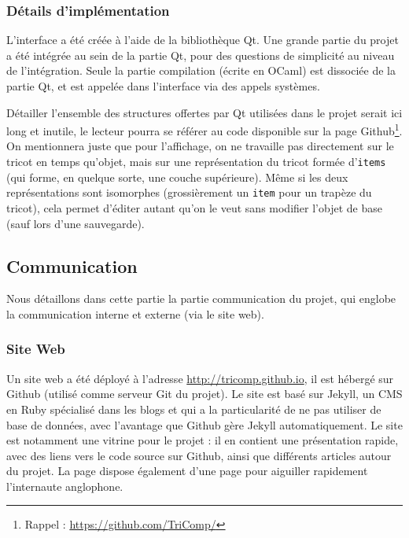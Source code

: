 \documentclass{article}
\begin{document}

\pagebreak

\subsubsection{Détails d'implémentation}

L'interface a été créée à l'aide de la bibliothèque Qt. Une grande
partie du projet a été intégrée au sein de la partie Qt, pour des
questions de simplicité au niveau de l'intégration. Seule la partie
compilation (écrite en OCaml) est dissociée de la partie Qt, et est
appelée dans l'interface via des appels systèmes.

Détailler l'ensemble des structures offertes par Qt utilisées dans le projet
serait ici long et inutile, le lecteur pourra se référer au code
disponible sur la page Github\footnote{Rappel :
  \url{https://github.com/TriComp/}}. On mentionnera juste que pour
l'affichage, on ne travaille pas directement sur le tricot en temps
qu'objet, mais sur une représentation du tricot formée
d'\texttt{items} (qui forme, en quelque sorte, une couche
supérieure). Même si les deux représentations sont isomorphes
(grossièrement un \texttt{item} pour un trapèze du tricot), cela
permet d'éditer autant qu'on le veut sans modifier l'objet de base
(sauf lors d'une sauvegarde).

\subsection{Communication}

Nous détaillons dans cette partie la partie communication du projet,
qui englobe la communication interne et externe (via le site web).

\subsubsection{Site Web}

Un site web a été déployé à l'adresse \url{http://tricomp.github.io}, il est hébergé
sur Github (utilisé comme serveur Git du projet). Le site est basé sur Jekyll, un 
CMS en Ruby spécialisé dans les blogs et qui a la particularité de ne pas utiliser 
de base de données, avec l'avantage que Github gère Jekyll automatiquement. Le site 
est notamment une vitrine pour le projet : il en contient une présentation rapide, 
avec des liens vers le code source sur Github, ainsi que différents articles autour du projet.
La page dispose également d'une page pour aiguiller rapidement l'internaute anglophone.
\end{document}
